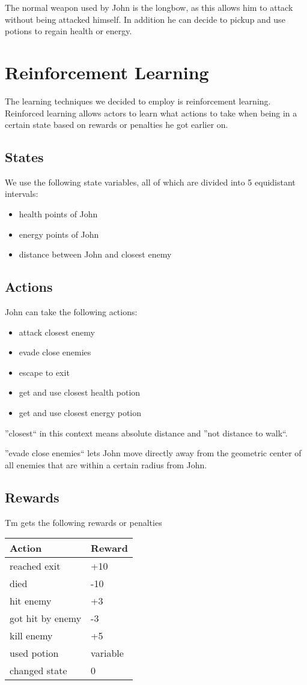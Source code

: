 \documentclass[a4paper,10pt]{scrartcl}
\begin{document}
The normal weapon used by John is the longbow, as this allows him to attack without being attacked himself. In addition he can decide to pickup and use potions to regain health or energy.

\section{Reinforcement Learning}\label{sec:rl}
The learning techniques we decided to employ is reinforcement learning. Reinforced learning allows actors to learn what actions to take when being in a certain state based on rewards or penalties he got earlier on.


\subsection{States}
We use the following state variables, all of which are divided into 5 equidistant intervals:
\begin{itemize}
 \item health points of John
 \item energy points of John
 \item distance between John and closest enemy
\end{itemize}

\subsection{Actions}
John can take the following actions:
\begin{itemize}
 \item attack closest enemy
 \item evade close enemies
 \item escape to exit
 \item get and use closest health potion
 \item get and use closest energy potion
\end{itemize}

''closest`` in this context means absolute distance and ''not distance to walk``.

''evade close enemies`` lets John move directly away from the geometric center of all enemies that are within a certain radius from John.

\subsection{Rewards}
Tm gets the following rewards or penalties
\begin{center}
\begin{tabular}{l|l}
Action & Reward \\
\hline
reached exit & +10 \\
died & -10 \\
hit enemy & +3 \\
got hit by enemy & -3 \\
kill enemy & +5 \\
used potion & variable\\
changed state & 0
\end{tabular}
\end{center}
\end{document}
